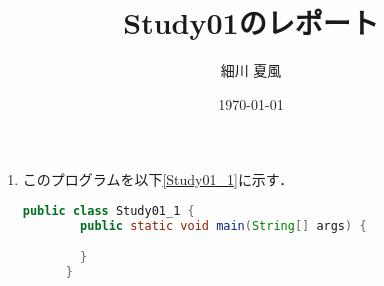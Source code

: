 \documentclass{jlreq}
\title{Study01のレポート}
\author{細川 夏風}
\date{\today}
\begin{document}
  \maketitle

  \begin{enumerate}
    \item このプログラムを以下\ref{Study01_1}に示す．
    \begin{lstlisting}[language=JAVA, caption=Study01\_1, label=Study01_1]
      public class Study01_1 {
        public static void main(String[] args) {

        }
      }
    \end{lstlisting}
  \end{enumerate}

  \begin{thebibliography}{99}

  \end{thebibliography}
  
\end{document}
